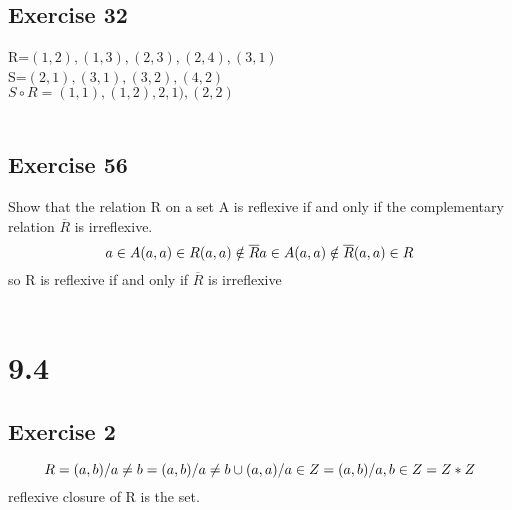 \documentclass[12pt]{article}
\begin{document}
\subsection*{Exercise 32}
R=${(1,2),(1,3),(2,3),(2,4),(3,1)}$\\
S=${(2,1),(3,1),(3,2),(4,2)}$\\
$S\circ R={(1,1),(1,2),2,1),(2,2)}$\\
\\
\subsection*{Exercise 56}
Show that the relation R on a set A is reflexive if and only if the complementary relation $\overline{R}$ is irreflexive.\\
\begin{equation}\nonumber
    a\in A\\
    (a,a)\in R\\
    (a,a)\notin \overline{R}\\
    \\
    \\
    a\in A\\
    (a,a)\notin \overline{R}\\
    (a,a)\in R\\
\end{equation}
so R is reflexive if and only if $\overline{R}$ is irreflexive\\
\\
\section*{9.4}
\subsection*{Exercise 2}
\begin{equation}\nonumber
    R={(a,b)/a\neq b}\\
    ={(a,b)/a\neq b}\cup {(a,a)/a\in Z}\\
    ={(a,b)/a,b\in Z}\\
    =Z*Z\\
\end{equation}
reflexive closure of R is the set.\\
\\
\end{document}
